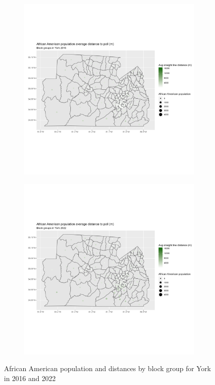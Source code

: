 \documentclass[11pt]{article}
\theoremstyle{remark}
\theoremstyle{definition}
\begin{document}
\begin{figure}
	\begin{subfigure}{.5\textwidth}
		\centering
		\includegraphics[width=\linewidth]{result analysis/York_SC_original_configs/black_pop_and_dist_York_config_original_2016_polls.png}
		\label{sfig:York_2016_bg_dist_pop}
	\end{subfigure} 
	\begin{subfigure}{.5\textwidth}
		\centering
		\includegraphics[width=\linewidth]{result analysis/York_SC_original_configs/black_pop_and_dist_York_config_original_2022_polls.png}
		\label{sfig:York_2022_bg_dist}
	\end{subfigure}
	\caption{African American population and distances by block group for York in 2016 and 2022}
	\label{fig:York distance Black population maps}
\end{figure}
\end{document}
